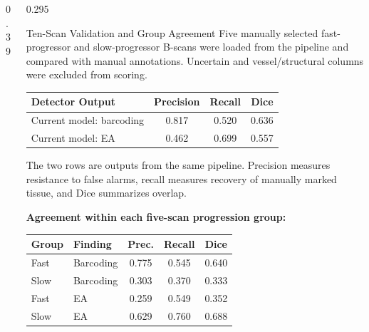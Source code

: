 \documentclass[final]{beamer}
\begin{document}
\begin{frame}[t]
\begin{columns}[t,totalwidth=\dimexpr\paperwidth-4cm\relax]
\begin{column}{0.39\textwidth}
\end{column}

\begin{column}{0.295\textwidth}
  \begin{block}{Ten-Scan Validation and Group Agreement}
    \vspace{0.3cm}
    Five manually selected fast-progressor and slow-progressor
    B-scans were loaded from the pipeline and
    compared with manual annotations. Uncertain and vessel/structural columns
    were excluded from scoring.

    \vspace{0.25cm}
    \centering
    \renewcommand{\arraystretch}{1.2}
    \begin{tabular}{lccc}
      \toprule
      \textbf{Detector Output} & \textbf{Precision} & \textbf{Recall} & \textbf{Dice}\\
      \midrule
      Current model: barcoding & 0.817 & 0.520 & 0.636\\
      Current model: EA & 0.462 & 0.699 & 0.557\\
      \bottomrule
    \end{tabular}

    \vspace{0.25cm}
    \justifying
    The two rows are outputs from the same pipeline. Precision measures
    resistance to false alarms, recall measures recovery of manually marked
    tissue, and Dice summarizes overlap.

    \vspace{0.3cm}
    \textbf{Agreement within each five-scan progression group:}
    \vspace{0.3cm}
    \centering
    \renewcommand{\arraystretch}{1.15}
    \begin{tabular}{llccc}
      \toprule
      \textbf{Group} & \textbf{Finding} & \textbf{Prec.} & \textbf{Recall} & \textbf{Dice}\\
      \midrule
      Fast & Barcoding & 0.775 & 0.545 & 0.640\\
      Slow & Barcoding & 0.303 & 0.370 & 0.333\\
      Fast & EA & 0.259 & 0.549 & 0.352\\
      Slow & EA & 0.629 & 0.760 & 0.688\\
      \bottomrule
    \end{tabular}


\end{block}
\end{column}
\end{columns}
\end{frame}
\end{document}
